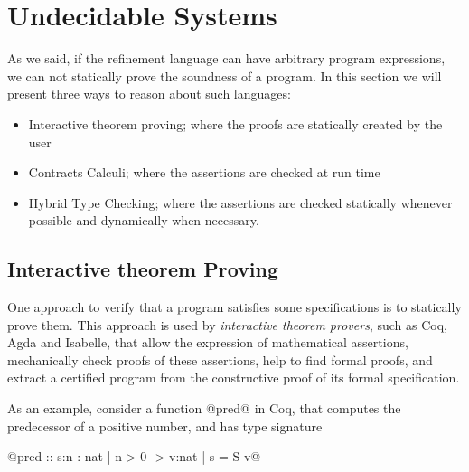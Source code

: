 \newcommand\trefc[4]{\ensuremath{\langle\{#1 : #2  \mid #3 \}\rangle^{#4}}}

\newcommand\tlabel{T-Label}
\newcommand\tcast{T-Cast}

\newcommand\cbase{C-Base}
\newcommand\cfunction{C-Fun}


\newcommand\elabel[1]{\ensuremath{\Uparrow \ #1}}
\newcommand\ecast[3]{\ensuremath{\langle #1 \Rightarrow #2 \rangle^{#3}}}

\newcommand\isCompatible[2]{\ensuremath{ #1 \Vert #2 }}

\section{Undecidable Systems}

As we said, if the refinement language can have arbitrary program expressions,
we can not statically prove the soundness of a program. 
%
In this section we will present three ways to reason about such languages:
\begin{itemize}
\item Interactive theorem proving; where the proofs are statically created by the user
\item Contracts Calculi; where the assertions are checked at run time
\item Hybrid Type Checking; where the assertions are checked statically whenever possible
and dynamically when necessary.
\end{itemize}



\subsection{Interactive theorem Proving}


One approach to verify that a program satisfies some 
specifications is to statically prove them.
% 
This approach is used by \textit{interactive theorem provers}, 
such as Coq, Agda and Isabelle,
that allow the 
expression of mathematical assertions, 
mechanically check proofs of these assertions, 
help to find formal proofs, 
and extract a certified program from 
the constructive proof of its formal specification.


As an example, consider a function @pred@ in Coq, 
that computes the predecessor of a positive number,
and has type signature

@pred :: s:{n : nat | n > 0}  -> {v:nat | s = S v}@

